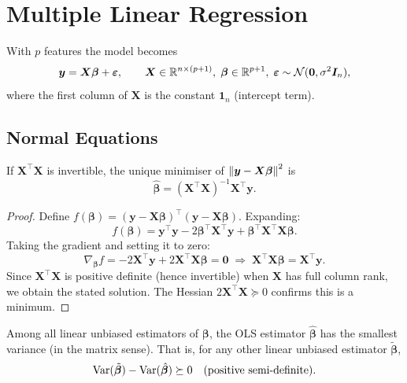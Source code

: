 \section{Multiple Linear Regression}

\begin{definition}
With $p$ features the model becomes
\[
    \bm{y} = \bm{X}\bm{\beta} + \bm{\varepsilon},
    \qquad
    \bm{X} \in \mathbb{R}^{n \times (p+1)},\;
    \bm{\beta} \in \mathbb{R}^{p+1},\;
    \bm{\varepsilon} \sim \mathcal{N}(\bm{0}, \sigma^2 \bm{I}_n),
\]
where the first column of $\bm{X}$ is the constant $\bm{1}_n$ (intercept term).
\end{definition}

\subsection{Normal Equations}

\begin{theorem}\label{thm:normal-eq}
If $\bm{X}^\top \bm{X}$ is invertible, the unique minimiser of $\left\| \bm{y} - \bm{X}\bm{\beta} \right\|^2$ is
\[
    \hat{\bm{\beta}} = (\bm{X}^\top \bm{X})^{-1} \bm{X}^\top \bm{y}.
\]
\end{theorem}

\begin{proof}
Define $f(\bm{\beta}) = (\bm{y}-\bm{X}\bm{\beta})^\top(\bm{y}-\bm{X}\bm{\beta})$. Expanding:
\[
    f(\bm{\beta}) = \bm{y}^\top\bm{y} - 2\bm{\beta}^\top\bm{X}^\top\bm{y} + \bm{\beta}^\top\bm{X}^\top\bm{X}\bm{\beta}.
\]
Taking the gradient and setting it to zero:
\[
    \nabla_{\bm{\beta}} f = -2\bm{X}^\top\bm{y} + 2\bm{X}^\top\bm{X}\bm{\beta} = \bm{0}
    \;\Longrightarrow\;
    \bm{X}^\top\bm{X}\bm{\beta} = \bm{X}^\top\bm{y}.
\]
Since $\bm{X}^\top\bm{X}$ is positive definite (hence invertible) when $\bm{X}$ has full column rank, we obtain the stated solution. The Hessian $2\bm{X}^\top\bm{X} \succeq 0$ confirms this is a minimum.
\end{proof}

\begin{proposition}
Among all linear unbiased estimators of $\bm{\beta}$, the OLS estimator $\hat{\bm{\beta}}$ has the smallest variance (in the matrix sense). That is, for any other linear unbiased estimator $\tilde{\bm{\beta}}$,
\[
    \mathrm{Var}(\tilde{\bm{\beta}}) - \mathrm{Var}(\hat{\bm{\beta}}) \succeq 0
    \quad (\text{positive semi-definite}).
\]
\end{proposition}

